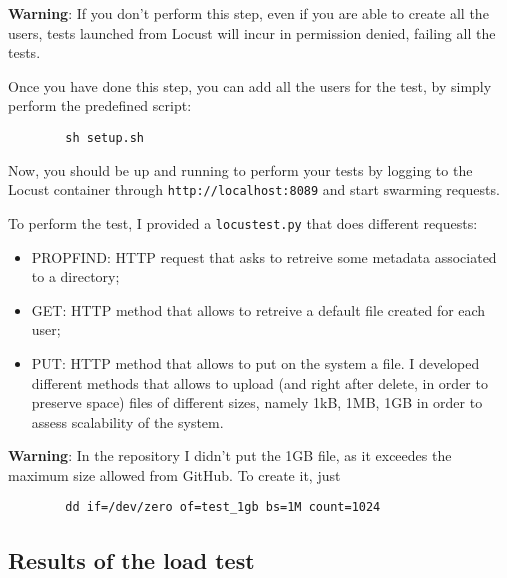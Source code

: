 \documentclass{article}
\begin{document}
	\textbf{Warning}: If you don't perform this step, even if you are able to create all the users, tests launched from Locust will incur in permission denied, failing all the tests.
	
	Once you have done this step, you can add all the users for the test, by simply perform the predefined script:
	\begin{verbatim}
		sh setup.sh
	\end{verbatim}
		
	Now, you should be up and running to perform your tests by logging to the Locust container through \verb|http://localhost:8089| and start swarming requests.
	
	To perform the test, I provided a \verb|locustest.py| that does different requests:
	\begin{itemize}
		\item PROPFIND: HTTP request that asks to retreive some metadata associated to a directory;
		\item GET: HTTP method that allows to retreive a default file created for each user;
		\item PUT: HTTP method that allows to put on the system a file. I developed 
		different methods that allows to upload (and right after delete, in order to preserve space) files of different sizes, namely 1kB, 1MB, 1GB in order to assess scalability of the system.
	\end{itemize}

	\textbf{Warning}: In the repository I didn't put the 1GB file, as it exceedes the maximum size allowed from GitHub. To create it, just
	\begin{verbatim}
		dd if=/dev/zero of=test_1gb bs=1M count=1024
	\end{verbatim}
	
	\subsection{Results of the load test}
	
\end{document}
